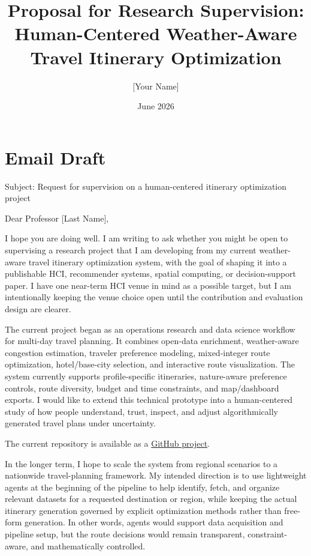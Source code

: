 \documentclass[11pt,a4paper]{article}
\title{\vspace{-1.5em}Proposal for Research Supervision:\\
Human-Centered Weather-Aware Travel Itinerary Optimization}
\author{[Your Name]}
\date{June 2026}
\begin{document}
\maketitle

\section*{Email Draft}

\noindent Subject: Request for supervision on a human-centered itinerary optimization project

\vspace{0.75em}

\noindent Dear Professor [Last Name],

\vspace{0.75em}

\noindent I hope you are doing well. I am writing to ask whether you might be open to supervising a research project that I am developing from my current weather-aware travel itinerary optimization system, with the goal of shaping it into a publishable HCI, recommender systems, spatial computing, or decision-support paper. I have one near-term HCI venue in mind as a possible target, but I am intentionally keeping the venue choice open until the contribution and evaluation design are clearer.

The current project began as an operations research and data science workflow for multi-day travel planning. It combines open-data enrichment, weather-aware congestion estimation, traveler preference modeling, mixed-integer route optimization, hotel/base-city selection, and interactive route visualization. The system currently supports profile-specific itineraries, nature-aware preference controls, route diversity, budget and time constraints, and map/dashboard exports. I would like to extend this technical prototype into a human-centered study of how people understand, trust, inspect, and adjust algorithmically generated travel plans under uncertainty.

The current repository is available as a \href{https://github.com/Ztang-Yit-Xiaang/weather-aware-travel-itinerary-optimization}{GitHub project}.

In the longer term, I hope to scale the system from regional scenarios to a nationwide travel-planning framework. My intended direction is to use lightweight agents at the beginning of the pipeline to help identify, fetch, and organize relevant datasets for a requested destination or region, while keeping the actual itinerary generation governed by explicit optimization methods rather than free-form generation. In other words, agents would support data acquisition and pipeline setup, but the route decisions would remain transparent, constraint-aware, and mathematically controlled.
\end{document}
